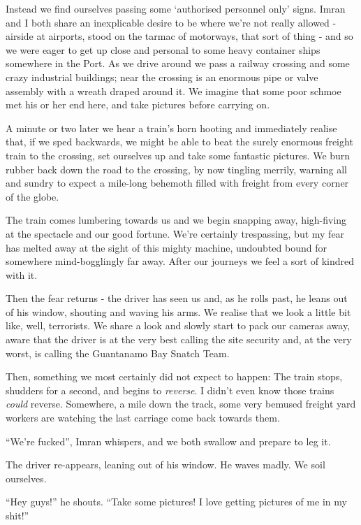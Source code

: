 \documentclass[a5paper,titlepage,11pt]{book}
\begin{document}
Instead we find ourselves passing some `authorised personnel only' signs.  Imran and I both share an inexplicable desire to be where we're not really allowed - airside at airports, stood on the tarmac of motorways, that sort of thing - and so we were eager to get up close and personal to some heavy container ships somewhere in the Port.  As we drive around we pass a railway crossing and some crazy industrial buildings; near the crossing is an enormous pipe or valve assembly with a wreath draped around it.  We imagine that some poor schmoe met his or her end here, and take pictures before carrying on.

A minute or two later we hear a train's horn hooting and immediately realise that, if we sped backwards, we might be able to beat the surely enormous freight train to the crossing, set ourselves up and take some fantastic pictures.  We burn rubber back down the road to the crossing, by now tingling merrily, warning all and sundry to expect a mile-long behemoth filled with freight from every corner of the globe.

The train comes lumbering towards us and we begin snapping away, high-fiving at the spectacle and our good fortune.  We're certainly trespassing, but my fear has melted away at the sight of this mighty machine, undoubted bound for somewhere mind-bogglingly far away.  After our journeys we feel a sort of kindred with it.

Then the fear returns - the driver has seen us and, as he rolls past, he leans out of his window, shouting and waving his arms.  We realise that we look a little bit like, well, terrorists.  We share a look and slowly start to pack our cameras away, aware that the driver is at the very best calling the site security and, at the very worst, is calling the Guantanamo Bay Snatch Team.

Then, something we most certainly did not expect to happen:  The train stops, shudders for a second, and begins to \emph{reverse}.  I didn't even know those trains \emph{could} reverse.  Somewhere, a mile down the track, some very bemused freight yard workers are watching the last carriage come back towards them.

``We're fucked'', Imran whispers, and we both swallow and prepare to leg it.

The driver re-appears, leaning out of his window.  He waves madly.  We soil ourselves.

``Hey guys!'' he shouts.  ``Take some pictures!  I love getting pictures of me in my shit!''
\end{document}

